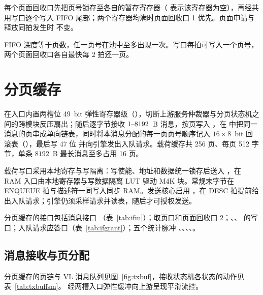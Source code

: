 每个页面回收口先把页号锁存至各自的暂存寄存器（ 表示该寄存器为空），再经共用写口逐个写入 FIFO 尾部；两个寄存器均满时页面回收口 1 优先。页面申请与释放同拍发生时  不变。

FIFO 深度等于页数，任一页号在池中至多出现一次。写口每拍可写入一个页号，两个页面回收口各自最快每 2 拍还一页。

\section{分页缓存}\label{sec:txbuf}

 在入口内置两槽位 49~bit 弹性寄存器级（），切断上游服务仲裁器与分页状态机之间的跨模块反压扇出；随后逐字节接收 $1\text{--}8192$~B 消息，按页写入 ，在  中把同一消息的页串成单向链表，同时将本消息分配的每一页页号顺序记入 $16\times 8$~bit 回滚表（），最后写 47 位  并向引擎发出入队请求。载荷缓存共 256 页、每页 512 字节，单条 $8192$~B 最长消息至多占用 16 页。

载荷写口采用本地寄存与写隔离：写使能、地址和数据统一锁存后送入 ，在 RAM 入口由本地寄存器与写数据隔离 LUT 驱动 M4K 块。常规末字节在 ENQUEUE 拍与描述符一同写入同步 RAM。发送核心启用 ，在 DESC 拍提前给出入队请求；引擎仍须采样请求并读表，随后才可授权发送。

分页缓存的接口包括消息接口 （表~\ref{tab:ifm}）；取页口和页面回收口 2；、、 的写口；入队请求应答口（表~\ref{tab:ifgrant}）；五个统计脉冲 、、、、。

\subsection{消息接收与页分配}

分页缓存的页链与 VL 消息队列见图~\ref{fig:txbuf}，接收状态机各状态的动作见表~\ref{tab:txbuffsm}。 经两槽入口弹性缓冲向上游呈现平滑流控。


